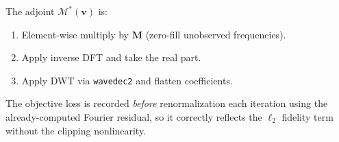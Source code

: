 \documentclass[10pt]{article}
\begin{document}
The adjoint $\mathcal{M}^*(\mathbf{v})$ is:
\begin{enumerate}
  \item Element-wise multiply by $\mathbf{M}$ (zero-fill unobserved
  frequencies).
  \item Apply inverse DFT and take the real part.
  \item Apply DWT via \texttt{wavedec2} and flatten coefficients.
\end{enumerate}

The objective loss is recorded \emph{before} renormalization each iteration
using the already-computed Fourier residual, so it correctly reflects the
$\ell_2$ fidelity term without the clipping nonlinearity.
\end{document}
